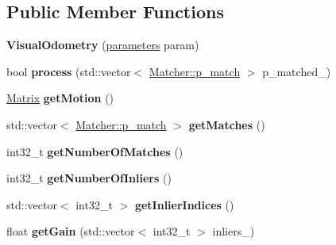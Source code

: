 \subsection*{Public Member Functions}
\begin{DoxyCompactItemize}
\item 
\hypertarget{class_visual_odometry_aca4e1f1cc799f6392303ab7fca26f81e}{{\bfseries Visual\+Odometry} (\hyperlink{struct_visual_odometry_1_1parameters}{parameters} param)}\label{class_visual_odometry_aca4e1f1cc799f6392303ab7fca26f81e}

\item 
\hypertarget{class_visual_odometry_af386ca261ddfc82c1da66cc92fb8554c}{bool {\bfseries process} (std\+::vector$<$ \hyperlink{struct_matcher_1_1p__match}{Matcher\+::p\+\_\+match} $>$ p\+\_\+matched\+\_\+)}\label{class_visual_odometry_af386ca261ddfc82c1da66cc92fb8554c}

\item 
\hypertarget{class_visual_odometry_a0e25df50775b1d6ccf65cfb582fcec6c}{\hyperlink{class_matrix}{Matrix} {\bfseries get\+Motion} ()}\label{class_visual_odometry_a0e25df50775b1d6ccf65cfb582fcec6c}

\item 
\hypertarget{class_visual_odometry_a3188ba4cd672fe3af210485b2234dfda}{std\+::vector$<$ \hyperlink{struct_matcher_1_1p__match}{Matcher\+::p\+\_\+match} $>$ {\bfseries get\+Matches} ()}\label{class_visual_odometry_a3188ba4cd672fe3af210485b2234dfda}

\item 
\hypertarget{class_visual_odometry_a5cdf9079cd4f96e782c15c97893af186}{int32\+\_\+t {\bfseries get\+Number\+Of\+Matches} ()}\label{class_visual_odometry_a5cdf9079cd4f96e782c15c97893af186}

\item 
\hypertarget{class_visual_odometry_a59dd3aec4cd992069eee7903621cef6a}{int32\+\_\+t {\bfseries get\+Number\+Of\+Inliers} ()}\label{class_visual_odometry_a59dd3aec4cd992069eee7903621cef6a}

\item 
\hypertarget{class_visual_odometry_a7ffc656cdb1d695a5981b44806749bde}{std\+::vector$<$ int32\+\_\+t $>$ {\bfseries get\+Inlier\+Indices} ()}\label{class_visual_odometry_a7ffc656cdb1d695a5981b44806749bde}

\item 
\hypertarget{class_visual_odometry_a3968f4e85ee9b06986a37a9430f899ab}{float {\bfseries get\+Gain} (std\+::vector$<$ int32\+\_\+t $>$ inliers\+\_\+)}\label{class_visual_odometry_a3968f4e85ee9b06986a37a9430f899ab}

\end{DoxyCompactItemize}
